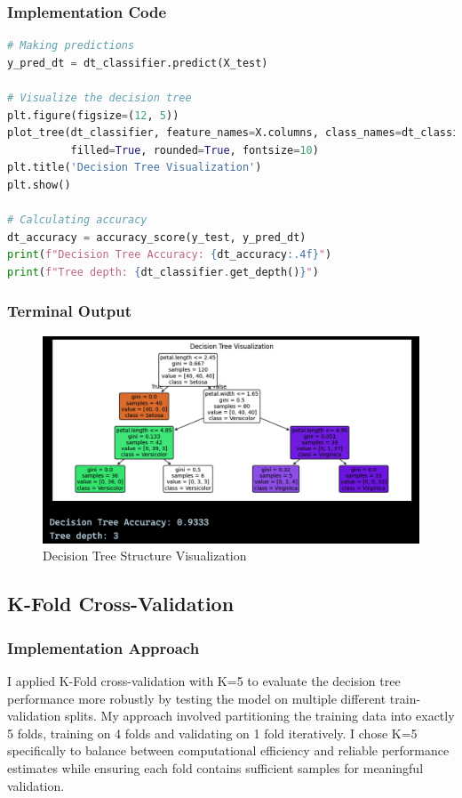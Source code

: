 \documentclass[12pt,a4paper]{article}
\begin{document}
\subsubsection{Implementation Code}
\begin{lstlisting}[language=Python, caption=Visualize the Tree and Compute Accuracy]
# Making predictions
y_pred_dt = dt_classifier.predict(X_test)

# Visualize the decision tree
plt.figure(figsize=(12, 5))
plot_tree(dt_classifier, feature_names=X.columns, class_names=dt_classifier.classes_, 
          filled=True, rounded=True, fontsize=10)
plt.title('Decision Tree Visualization')
plt.show()

# Calculating accuracy
dt_accuracy = accuracy_score(y_test, y_pred_dt)
print(f"Decision Tree Accuracy: {dt_accuracy:.4f}")
print(f"Tree depth: {dt_classifier.get_depth()}")
\end{lstlisting}

\newpage
\subsubsection{Terminal Output}

\begin{figure}[h!]
    \centering
    \includegraphics[width=\textwidth]{Figures/visualize.png}
    \caption{Decision Tree Structure Visualization}
    \label{fig:dt_structure}
\end{figure}

\subsection{K-Fold Cross-Validation}

\subsubsection{Implementation Approach}
I applied K-Fold cross-validation with K=5 to evaluate the decision tree performance more robustly by testing the model on multiple different train-validation splits. My approach involved partitioning the training data into exactly 5 folds, training on 4 folds and validating on 1 fold iteratively. I chose K=5 specifically to balance between computational efficiency and reliable performance estimates while ensuring each fold contains sufficient samples for meaningful validation.
\end{document}
